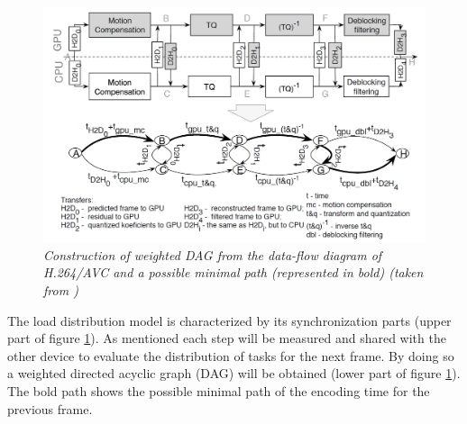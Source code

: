 \begin{figure}[ht]
\centerline{\includegraphics[scale=0.4]{pics/dynamic_model}} %
\caption{\label{dynamic_model}{\it Construction of weighted DAG from the data-flow diagram of H.264/AVC and
a possible minimal path (represented in bold) (taken from \cite{Paper2})}}
\end{figure} %

The load distribution model is characterized by its synchronization parts (upper part of figure \ref{dynamic_model}). As mentioned each step will be measured and shared with the other device to evaluate the distribution of tasks for the next frame. By doing so a weighted directed acyclic graph (DAG) will be obtained  (lower part of figure \ref{dynamic_model}). The bold path shows the possible minimal path of the encoding time for the previous frame.\\